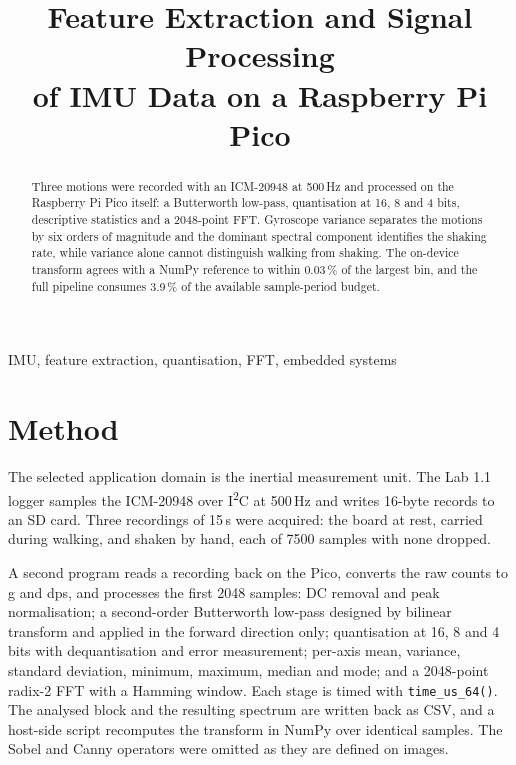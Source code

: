 \documentclass[conference]{IEEEtran}
\begin{document}
\title{Feature Extraction and Signal Processing\\of IMU Data on a Raspberry Pi Pico}

\author{
}

\maketitle

\begin{abstract}
Three motions were recorded with an ICM-20948 at 500\,Hz and processed on the
Raspberry Pi Pico itself: a Butterworth low-pass, quantisation at 16, 8 and 4
bits, descriptive statistics and a 2048-point FFT. Gyroscope variance separates
the motions by six orders of magnitude and the dominant spectral component
identifies the shaking rate, while variance alone cannot distinguish walking
from shaking. The on-device transform agrees with a NumPy reference to within
0.03\,\% of the largest bin, and the full pipeline consumes 3.9\,\% of the
available sample-period budget.
\end{abstract}

\begin{IEEEkeywords}
IMU, feature extraction, quantisation, FFT, embedded systems
\end{IEEEkeywords}

\section{Method}

The selected application domain is the inertial measurement unit. The Lab 1.1
logger samples the ICM-20948 over I\textsuperscript{2}C at 500\,Hz and writes
16-byte records to an SD card. Three recordings of 15\,s were acquired: the
board at rest, carried during walking, and shaken by hand, each of 7500
samples with none dropped.

A second program reads a recording back on the Pico, converts the raw counts to
g and dps, and processes the first 2048 samples: DC removal and peak
normalisation; a second-order Butterworth low-pass designed by bilinear
transform and applied in the forward direction only; quantisation at 16, 8 and 4
bits with dequantisation and error measurement; per-axis mean, variance,
standard deviation, minimum, maximum, median and mode; and a 2048-point radix-2
FFT with a Hamming window. Each stage is timed with \texttt{time\_us\_64()}. The
analysed block and the resulting spectrum are written back as CSV, and a
host-side script recomputes the transform in NumPy over identical samples. The
Sobel and Canny operators were omitted as they are defined on images.
\end{document}
